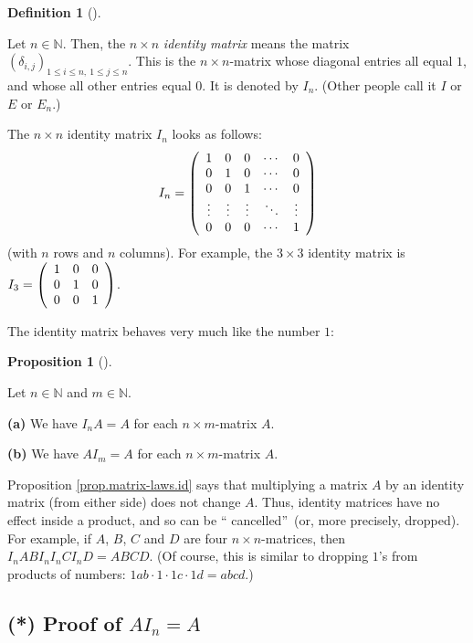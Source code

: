\documentclass[numbers=enddot,12pt,final,onecolumn,notitlepage]{scrartcl}%
\theoremstyle{definition}
\newtheorem{prop}[theo]{Proposition}
\newenvironment{proposition}[1][]
{\begin{prop}[#1]\begin{leftbar}}
{\end{leftbar}\end{prop}}
\newtheorem{defi}[theo]{Definition}
\newenvironment{definition}[1][]
{\begin{defi}[#1]\begin{leftbar}}
{\end{leftbar}\end{defi}}
\begin{document}
\begin{definition}
Let $n\in\mathbb{N}$. Then, the $n\times n$ \textit{identity matrix} means the
matrix $\left(  \delta_{i,j}\right)  _{1\leq i\leq n,\ 1\leq j\leq n}$. This
is the $n\times n$-matrix whose diagonal entries all equal $1$, and whose all
other entries equal $0$. It is denoted by $I_{n}$. (Other people call it $I$
or $E$ or $E_{n}$.)
\end{definition}

The $n\times n$ identity matrix $I_{n}$ looks as follows:%
\[
I_{n}=\left(
\begin{array}
[c]{ccccc}%
1 & 0 & 0 & \cdots & 0\\
0 & 1 & 0 & \cdots & 0\\
0 & 0 & 1 & \cdots & 0\\
\vdots & \vdots & \vdots & \ddots & \vdots\\
0 & 0 & 0 & \cdots & 1
\end{array}
\right)
\]
(with $n$ rows and $n$ columns). For example, the $3\times3$ identity matrix
is $I_{3}=\left(
\begin{array}
[c]{ccc}%
1 & 0 & 0\\
0 & 1 & 0\\
0 & 0 & 1
\end{array}
\right)  $.

The identity matrix behaves very much like the number $1$:

\begin{proposition}
\label{prop.matrix-laws.id}Let $n\in\mathbb{N}$ and $m\in\mathbb{N}$.

\textbf{(a)} We have $I_{n}A=A$ for each $n\times m$-matrix $A$.

\textbf{(b)} We have $AI_{m}=A$ for each $n\times m$-matrix $A$.
\end{proposition}

Proposition \ref{prop.matrix-laws.id} says that multiplying a matrix $A$ by an
identity matrix (from either side) does not change $A$. Thus, identity
matrices have no effect inside a product, and so can be \textquotedblleft
cancelled\textquotedblright\ (or, more precisely, dropped). For example, if
$A$, $B$, $C$ and $D$ are four $n\times n$-matrices, then $I_{n}ABI_{n}%
I_{n}CI_{n}D=ABCD$. (Of course, this is similar to dropping $1$'s from
products of numbers: $1ab\cdot1\cdot1c\cdot1d=abcd$.)

\subsection{(*) Proof of $AI_{n}=A$}
\end{document}

